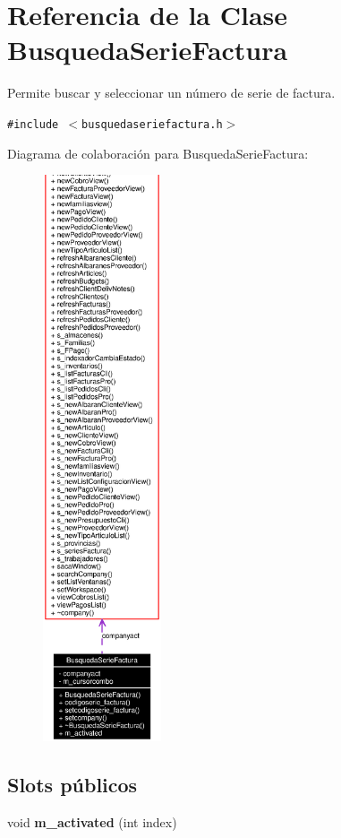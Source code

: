 \section{Referencia de la Clase Busqueda\-Serie\-Factura}
\label{classBusquedaSerieFactura}
Permite buscar y seleccionar un n\'{u}mero de serie de factura.  


{\tt \#include $<$busquedaseriefactura.h$>$}

Diagrama de colaboraci\'{o}n para Busqueda\-Serie\-Factura:\begin{figure}[H]
\begin{center}
\leavevmode
\includegraphics[width=99pt]{classBusquedaSerieFactura__coll__graph}
\end{center}
\end{figure}
\subsection*{Slots p\'{u}blicos}
\begin{CompactItemize}
\item 
void {\bf m\_\-activated} (int index)\label{classBusquedaSerieFactura_i0}

\end{CompactItemize}
